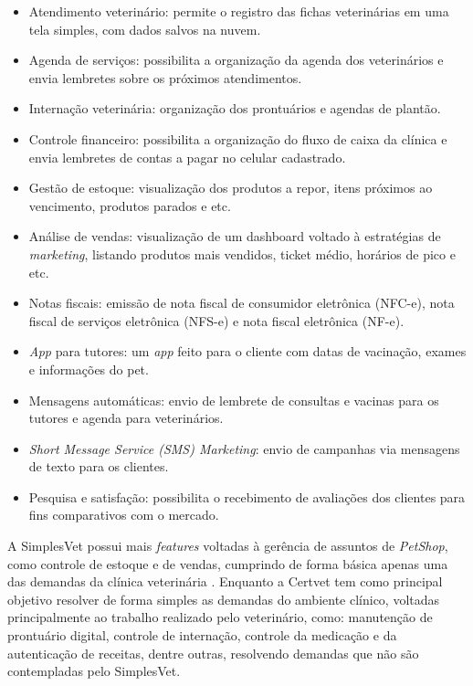 \documentclass[
    12pt,               %
    openright,          %
    oneside,
    a4paper,            %
    BIBLATEX,           %
    TODO,               %
    english,            %
    brazil              %
    ]{ifsp-spo-inf-ctds}
\begin{document}
\begin{itemize}

    \item Atendimento veterinário: permite o registro das fichas veterinárias em uma tela simples, com dados salvos na nuvem.
    \item Agenda de serviços: possibilita a organização da agenda dos veterinários e envia lembretes sobre os próximos atendimentos.
    \item Internação veterinária: organização dos prontuários e agendas de plantão.
    \item Controle financeiro: possibilita a organização do fluxo de caixa da clínica e envia lembretes de contas a pagar no celular cadastrado.
    \item Gestão de estoque: visualização dos produtos a repor, itens próximos ao vencimento, produtos parados e etc.
    \item Análise de vendas: visualização de um dashboard voltado à estratégias de \emph{marketing}, listando produtos mais vendidos, ticket médio, horários de pico e etc.
    \item Notas fiscais: emissão de nota fiscal de consumidor eletrônica (NFC-e), nota fiscal de serviços eletrônica (NFS-e) e nota fiscal eletrônica (NF-e).
    \item \emph{App} para tutores: um \emph{app} feito para o cliente com datas de vacinação, exames e informações do pet.
    \item Mensagens automáticas: envio de lembrete de consultas e vacinas para os tutores e agenda para veterinários.
    \item \emph{Short Message Service (SMS) Marketing}: envio de campanhas via mensagens de texto para os clientes.
    \item Pesquisa e satisfação: possibilita o recebimento de avaliações dos clientes para fins comparativos com o mercado.
\end{itemize}

A SimplesVet possui mais \emph{features} voltadas à gerência de assuntos de \emph{PetShop}, como controle de estoque e de vendas, cumprindo de forma básica apenas uma das demandas da clínica veterinária . Enquanto a Certvet tem como principal objetivo resolver de forma simples as demandas do ambiente clínico, voltadas principalmente ao trabalho realizado pelo veterinário, como: manutenção de prontuário digital, controle de internação, controle da medicação e da autenticação de receitas, dentre outras, resolvendo demandas que não são contempladas pelo SimplesVet.
\end{document}
